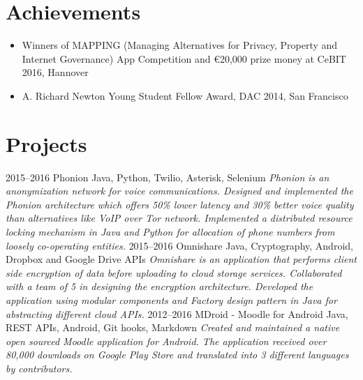 \documentclass[]{friggeri-cv}
\begin{document}
\section{Achievements}
\begin{itemize}
  \item Winners of MAPPING (Managing Alternatives for Privacy, Property and Internet Governance) App Competition and \euro 20,000 prize money at CeBIT 2016, Hannover
  \item A. Richard Newton Young Student Fellow Award, DAC 2014, San Francisco
\end{itemize}
\vspace{0.3cm}

\section{Projects}
\begin{entrylist}
  \entry
    {2015–2016}
    {Phonion}
    {Java, Python, Twilio, Asterisk, Selenium}
    {\emph{Phonion is an anonymization network for voice communications. Designed and implemented the Phonion architecture which offers 50\% lower latency and 30\% better voice quality than alternatives like VoIP over Tor network. Implemented a distributed resource locking mechanism in Java and Python for allocation of phone numbers from loosely co-operating entities.}}
  \entry
    {2015–2016}
    {Omnishare}
    {Java, Cryptography, Android, Dropbox and Google Drive APIs}
    {\emph{Omnishare is an application that performs client side encryption of data before uploading to cloud storage services. Collaborated with a team of 5 in designing the encryption architecture. Developed the application using modular components and Factory design pattern in Java for abstracting different cloud APIs.}}
  \entry
    {2012–2016}
    {MDroid - Moodle for Android}
    {Java, REST APIs, Android, Git hooks, Markdown}
    {\emph{Created and maintained a native open sourced Moodle application for Android. The application received over 80,000 downloads on Google Play Store and translated into 3 different languages by contributors.}}
\end{entrylist}
\end{document}
